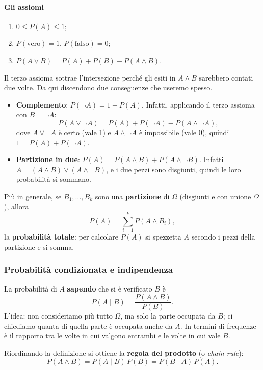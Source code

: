 \documentclass[12pt]{extarticle}
\begin{document}
\paragraph{Gli assiomi}
\begin{enumerate}
    \item $0 \le P(A) \le 1$;
    \item $P(\text{vero}) = 1$, $P(\text{falso}) = 0$;
    \item $P(A \lor B) = P(A) + P(B) - P(A \land B)$.
\end{enumerate}
Il terzo assioma sottrae l'intersezione perché gli esiti in $A \land B$ sarebbero contati due volte. Da qui discendono due conseguenze che useremo spesso.
\begin{itemize}
    \item \textbf{Complemento}: $P(\neg A) = 1 - P(A)$. Infatti, applicando il terzo assioma con $B=\neg A$:
    \[
    P(A \lor \neg A) = P(A) + P(\neg A) - P(A \land \neg A),
    \]
    dove $A \lor \neg A$ è certo (vale 1) e $A \land \neg A$ è impossibile (vale 0), quindi $1 = P(A)+P(\neg A)$.
    \item \textbf{Partizione in due}: $P(A) = P(A \land B) + P(A \land \neg B)$. Infatti $A = (A \land B) \lor (A \land \neg B)$, e i due pezzi sono disgiunti, quindi le loro probabilità si sommano.
\end{itemize}

\noindent Più in generale, se $B_1,\dots,B_k$ sono una \textbf{partizione} di $\Omega$ (disgiunti e con unione $\Omega$), allora
\[
P(A) = \sum_{i=1}^{k} P(A \land B_i),
\]
la \textbf{probabilità totale}: per calcolare $P(A)$ si spezzetta $A$ secondo i pezzi della partizione e si somma.

\subsubsection{Probabilità condizionata e indipendenza}

\noindent La probabilità di $A$ \textbf{sapendo} che si è verificato $B$ è
\[
P(A \mid B) = \frac{P(A \land B)}{P(B)}.
\]
L'idea: non consideriamo più tutto $\Omega$, ma solo la parte occupata da $B$; ci chiediamo quanta di quella parte è occupata anche da $A$. In termini di frequenze è il rapporto tra le volte in cui valgono entrambi e le volte in cui vale $B$.

\noindent Riordinando la definizione si ottiene la \textbf{regola del prodotto} (o \emph{chain rule}):
\[
P(A \land B) = P(A \mid B)\,P(B) = P(B \mid A)\,P(A).
\]
\end{document}
